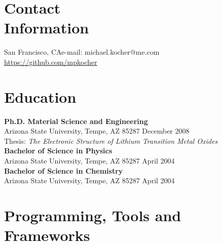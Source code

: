 \documentclass[margin,line]{resume}
\begin{document}
\begin{resume}

    \section{\mysidestyle Contact\\Information}

    San Francisco, CA\hfill e-mail: michael.kocher@me.com\\\vspace{4.0mm}
    \hfill{\url{https://github.com/mpkocher}}\\\vspace{-9.0mm}


    
    \section{\mysidestyle Education}

    \textbf{Ph.D. Material Science and Engineering} \\
    Arizona State University,  Tempe, AZ 85287 \hfill December 2008\\
    Thesis: \textsl{The Electronic Structure of Lithium Transition Metal Oxides}\vspace{2mm}\\
    \textbf{Bachelor of Science in Physics} \\
    Arizona State University,  Tempe, AZ 85287 \hfill April 2004\vspace{2mm}\\
    \textbf{Bachelor of Science in Chemistry}\\
    Arizona State University,  Tempe, AZ 85287 \hfill April 2004\\\vspace{-3mm}




    \section{\mysidestyle Programming, Tools and Frameworks}


\end{resume}
\end{document}
